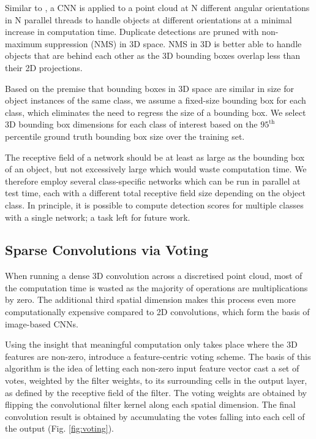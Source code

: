 \documentclass[letterpaper, 10 pt, conference]{tex_style/ieeeconf}
\begin{document}
Similar to \cite{wang2015voting}, a CNN is applied to a point cloud at N different angular orientations in N parallel threads to handle objects at different orientations at a minimal increase in computation time.
Duplicate detections are pruned with non-maximum suppression (NMS) in 3D space.
NMS in 3D is better able to handle objects that are behind each other as the 3D bounding boxes overlap less than their 2D projections.

Based on the premise that bounding boxes in 3D space are similar in size for object instances of the same class, we assume a fixed-size bounding box for each class, which eliminates the need to regress the size of a bounding box.
We select 3D bounding box dimensions for each class of interest based on the $95^{\mathrm{th}}$ percentile ground truth bounding box size over the training set.

The receptive field of a network should be at least as large as the bounding box of an object, but not excessively large which would waste computation time.
We therefore employ several class-specific networks which can be run in parallel at test time, each with a different total receptive field size depending on the object class.
In principle, it is possible to compute detection scores for multiple classes with a single network; a task left for future work.


\subsection{Sparse Convolutions via Voting}
When running a dense 3D convolution across a discretised point cloud, most of the computation time is wasted as the majority of operations are multiplications by zero.
The additional third spatial dimension makes this process even more computationally expensive compared to 2D convolutions, which form the basis of image-based CNNs.

Using the insight that meaningful computation only takes place where the 3D features are non-zero, \cite{wang2015voting} introduce a feature-centric voting scheme.
The basis of this algorithm is the idea of letting each non-zero input feature vector cast a set of votes, weighted by the filter weights, to its surrounding cells in the output layer, as defined by the receptive field of the filter.
The voting weights are obtained by flipping the convolutional filter kernel along each spatial dimension. The final convolution result is obtained by accumulating the votes falling into each cell of the output (Fig. \ref{fig:voting}).
\end{document}

